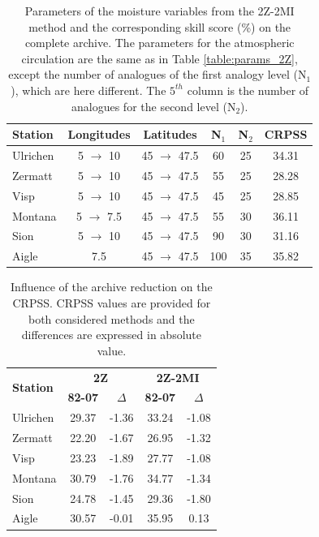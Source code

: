 \documentclass[hess]{copernicus}
\begin{document}
\begin{table}[htb]
	\caption{Parameters of the moisture variables from the 2Z-2MI method and the corresponding skill score (\%) on the complete archive. The parameters for the atmospheric circulation are the same as in Table \ref{table:params_2Z}, except the number of analogues of the first analogy level (N$_{1}$), which are here different. The $5^{th}$ column is the number of analogues for the second level (N$_{2}$).}
	\begin{center}
		\begin{tabular}{l c c c c c }
			\hline
			\textbf{Station} & \textbf{Longitudes} & \textbf{Latitudes} & \textbf{N$_{1}$} & \textbf{N$_{2}$} & \textbf{CRPSS} \\
			\hline
			Ulrichen & 5 $\rightarrow$ 10 & 45 $\rightarrow$ 47.5 & 60 & 25 & 34.31 \\
			Zermatt & 5 $\rightarrow$ 10 & 45 $\rightarrow$ 47.5 & 55 & 25 & 28.28 \\
			Visp & 5 $\rightarrow$ 10 & 45 $\rightarrow$ 47.5 & 45 & 25 & 28.85 \\
			Montana & 5 $\rightarrow$ 7.5 & 45 $\rightarrow$ 47.5 & 55 & 30 & 36.11 \\
			Sion & 5 $\rightarrow$ 10 & 45 $\rightarrow$ 47.5 & 90 & 30 & 31.16 \\
			Aigle & 7.5 & 45 $\rightarrow$ 47.5 & 100 & 35 & 35.82 \\ 
			\hline
		\end{tabular}
	\end{center}
	\label{table:params_2Z-2MI}
\end{table}

\begin{table}[htb]
	\caption{Influence of the archive reduction on the CRPSS. CRPSS values are provided for both considered methods and the differences are expressed in absolute value.}
	\begin{center}
		\begin{tabular}{l c c c c }
			\hline
			\multirow{2}{*}{\textbf{Station}} & \multicolumn{2}{c}{\textbf{2Z}} & \multicolumn{2}{c}{\textbf{2Z-2MI}} \\
			& \textbf{82-07} & \textbf{$\Delta$} & \textbf{82-07} & \textbf{$\Delta$} \\ 
			\hline
			Ulrichen & 29.37 & -1.36 & 33.24 & -1.08 \\
			Zermatt & 22.20 & -1.67 & 26.95 & -1.32 \\
			Visp & 23.23 & -1.89 & 27.77 & -1.08 \\
			Montana & 30.79 & -1.76 & 34.77 & -1.34 \\
			Sion & 24.78 & -1.45 & 29.36 & -1.80 \\
			Aigle & 30.57 & -0.01 & 35.95 & 0.13 \\ 
			\hline
		\end{tabular}
	\end{center}
	\label{table:loss_reduction}
\end{table}
\end{document}
